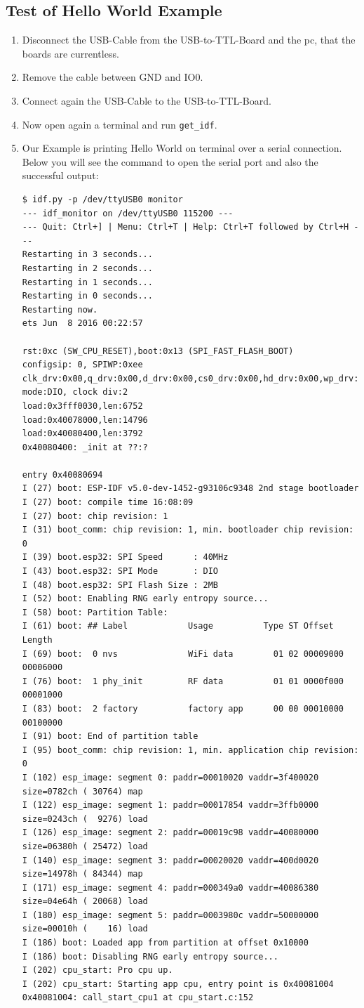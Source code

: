 \subsection{Test of Hello World Example}
\begin{enumerate}
\item Disconnect the USB-Cable from the USB-to-TTL-Board and the pc, that the boards are currentless. 
\item Remove the cable between GND and IO0.
\item Connect again the USB-Cable to the USB-to-TTL-Board.
\item Now open again a terminal and run \texttt{get\_idf}.
\item Our Example is printing Hello World on terminal over a serial connection. Below you will see the command to open the serial port and also the successful output:
\begin{lstlisting}
$ idf.py -p /dev/ttyUSB0 monitor
--- idf_monitor on /dev/ttyUSB0 115200 ---
--- Quit: Ctrl+] | Menu: Ctrl+T | Help: Ctrl+T followed by Ctrl+H ---
Restarting in 3 seconds...
Restarting in 2 seconds...
Restarting in 1 seconds...
Restarting in 0 seconds...
Restarting now.
ets Jun  8 2016 00:22:57

rst:0xc (SW_CPU_RESET),boot:0x13 (SPI_FAST_FLASH_BOOT)
configsip: 0, SPIWP:0xee
clk_drv:0x00,q_drv:0x00,d_drv:0x00,cs0_drv:0x00,hd_drv:0x00,wp_drv:0x00
mode:DIO, clock div:2
load:0x3fff0030,len:6752
load:0x40078000,len:14796
load:0x40080400,len:3792
0x40080400: _init at ??:?

entry 0x40080694
I (27) boot: ESP-IDF v5.0-dev-1452-g93106c9348 2nd stage bootloader
I (27) boot: compile time 16:08:09
I (27) boot: chip revision: 1
I (31) boot_comm: chip revision: 1, min. bootloader chip revision: 0
I (39) boot.esp32: SPI Speed      : 40MHz
I (43) boot.esp32: SPI Mode       : DIO
I (48) boot.esp32: SPI Flash Size : 2MB
I (52) boot: Enabling RNG early entropy source...
I (58) boot: Partition Table:
I (61) boot: ## Label            Usage          Type ST Offset   Length
I (69) boot:  0 nvs              WiFi data        01 02 00009000 00006000
I (76) boot:  1 phy_init         RF data          01 01 0000f000 00001000
I (83) boot:  2 factory          factory app      00 00 00010000 00100000
I (91) boot: End of partition table
I (95) boot_comm: chip revision: 1, min. application chip revision: 0
I (102) esp_image: segment 0: paddr=00010020 vaddr=3f400020 size=0782ch ( 30764) map
I (122) esp_image: segment 1: paddr=00017854 vaddr=3ffb0000 size=0243ch (  9276) load
I (126) esp_image: segment 2: paddr=00019c98 vaddr=40080000 size=06380h ( 25472) load
I (140) esp_image: segment 3: paddr=00020020 vaddr=400d0020 size=14978h ( 84344) map
I (171) esp_image: segment 4: paddr=000349a0 vaddr=40086380 size=04e64h ( 20068) load
I (180) esp_image: segment 5: paddr=0003980c vaddr=50000000 size=00010h (    16) load
I (186) boot: Loaded app from partition at offset 0x10000
I (186) boot: Disabling RNG early entropy source...
I (202) cpu_start: Pro cpu up.
I (202) cpu_start: Starting app cpu, entry point is 0x40081004
0x40081004: call_start_cpu1 at cpu_start.c:152


\end{lstlisting}
\end{enumerate}
